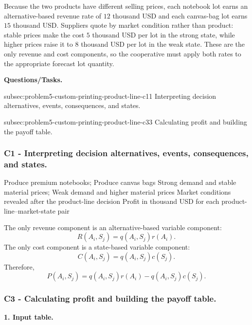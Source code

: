 	Because the two products have different selling prices, each notebook lot earns an alternative-based revenue rate of \(12\) thousand USD and each canvas-bag lot earns \(15\) thousand USD. Suppliers quote by market condition rather than product: stable prices make the cost \(5\) thousand USD per lot in the strong state, while higher prices raise it to \(8\) thousand USD per lot in the weak state. These are the only revenue and cost components, so the cooperative must apply both rates to the appropriate forecast lot quantity.

	\textbf{Questions/Tasks.}
	\begin{enumerate}
		\CriterionTask
		{subsec:problem5-custom-printing-product-line-c1}{1}
		{Interpreting decision alternatives, events, consequences, and states.}

		\CriterionTask
		{subsec:problem5-custom-printing-product-line-c3}{3}
		{Calculating profit and building the payoff table.}
	\end{enumerate}

	\subsubsection*{C1 - Interpreting decision alternatives, events, consequences, and states.}
	\label{subsec:problem5-custom-printing-product-line-c1}

	\DecisionElementsTable
	{Produce premium notebooks; Produce canvas bags}
	{Strong demand and stable material prices; Weak demand and higher material prices}
	{Market conditions revealed after the product-line decision}
	{Profit in thousand USD for each product-line--market-state pair}

	The only revenue component is an alternative-based variable component:
	\[
	R(A_i,S_j)=q(A_i,S_j)r(A_i).
	\]
	The only cost component is a state-based variable component:
	\[
	C(A_i,S_j)=q(A_i,S_j)c(S_j).
	\]
	Therefore,
	\[
	P(A_i,S_j)
	=
	q(A_i,S_j)r(A_i)
	-
	q(A_i,S_j)c(S_j).
	\]


	\subsubsection*{C3 - Calculating profit and building the payoff table.}
	\label{subsec:problem5-custom-printing-product-line-c3}

\textbf{1. Input table.}

